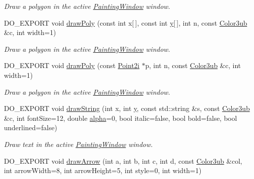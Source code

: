 \begin{DoxyCompactItemize}
\begin{DoxyCompactList}\small\item\em Draw a polygon in the active \hyperlink{class_d_o_1_1_painting_window}{Painting\-Window} window. \end{DoxyCompactList}\item 
D\-O\-\_\-\-E\-X\-P\-O\-R\-T void \hyperlink{group___draw2_d_ga046ecaf871cc43b13a63fbe84a7074af}{draw\-Poly} (const int x\mbox{[}$\,$\mbox{]}, const int \hyperlink{group___channel_accessors_gac90c52c5b3a7b2a7e3761e6e84f25778}{y}\mbox{[}$\,$\mbox{]}, int n, const \hyperlink{group___color_types_ga018b76cd00a4f9dca7dd06246d5bd3aa}{Color3ub} \&c, int width=1)
\begin{DoxyCompactList}\small\item\em Draw a polygon in the active \hyperlink{class_d_o_1_1_painting_window}{Painting\-Window} window. \end{DoxyCompactList}\item 
D\-O\-\_\-\-E\-X\-P\-O\-R\-T void \hyperlink{group___draw2_d_gaf83f860ff583d8ea177703d589d43568}{draw\-Poly} (const \hyperlink{group___eigen_typedefs_ga048a27763e58f682b1b91af86144f701}{Point2i} $\ast$p, int n, const \hyperlink{group___color_types_ga018b76cd00a4f9dca7dd06246d5bd3aa}{Color3ub} \&c, int width=1)
\begin{DoxyCompactList}\small\item\em Draw a polygon in the active \hyperlink{class_d_o_1_1_painting_window}{Painting\-Window} window. \end{DoxyCompactList}\item 
D\-O\-\_\-\-E\-X\-P\-O\-R\-T void \hyperlink{group___draw2_d_gabc402ab820b0c16d0179e526de04949d}{draw\-String} (int x, int \hyperlink{group___channel_accessors_gac90c52c5b3a7b2a7e3761e6e84f25778}{y}, const std\-::string \&s, const \hyperlink{group___color_types_ga018b76cd00a4f9dca7dd06246d5bd3aa}{Color3ub} \&c, int font\-Size=12, double \hyperlink{group___channel_accessors_gaa131549883a0aae99914ffe78da0dbcb}{alpha}=0, bool italic=false, bool bold=false, bool underlined=false)
\begin{DoxyCompactList}\small\item\em Draw text in the active \hyperlink{class_d_o_1_1_painting_window}{Painting\-Window} window. \end{DoxyCompactList}\item 
D\-O\-\_\-\-E\-X\-P\-O\-R\-T void \hyperlink{group___draw2_d_ga16d65640d0280fda29e54c359bf03357}{draw\-Arrow} (int a, int b, int c, int d, const \hyperlink{group___color_types_ga018b76cd00a4f9dca7dd06246d5bd3aa}{Color3ub} \&col, int arrow\-Width=8, int arrow\-Height=5, int style=0, int width=1)

\end{DoxyCompactItemize}

